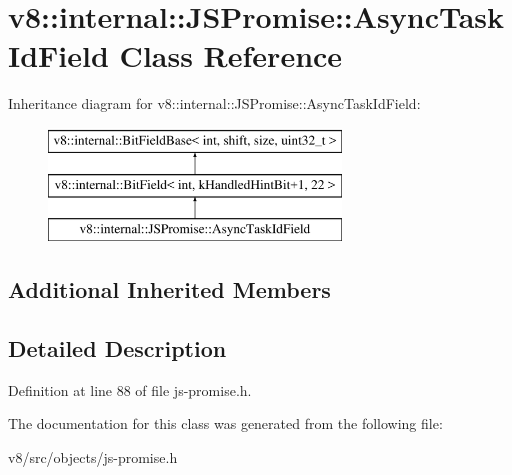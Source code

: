 \hypertarget{classv8_1_1internal_1_1JSPromise_1_1AsyncTaskIdField}{}\section{v8\+:\+:internal\+:\+:J\+S\+Promise\+:\+:Async\+Task\+Id\+Field Class Reference}
\label{classv8_1_1internal_1_1JSPromise_1_1AsyncTaskIdField}
Inheritance diagram for v8\+:\+:internal\+:\+:J\+S\+Promise\+:\+:Async\+Task\+Id\+Field\+:\begin{figure}[H]
\begin{center}
\leavevmode
\includegraphics[height=3.000000cm]{classv8_1_1internal_1_1JSPromise_1_1AsyncTaskIdField}
\end{center}
\end{figure}
\subsection*{Additional Inherited Members}


\subsection{Detailed Description}


Definition at line 88 of file js-\/promise.\+h.



The documentation for this class was generated from the following file\+:\begin{DoxyCompactItemize}
\item 
v8/src/objects/js-\/promise.\+h\end{DoxyCompactItemize}
